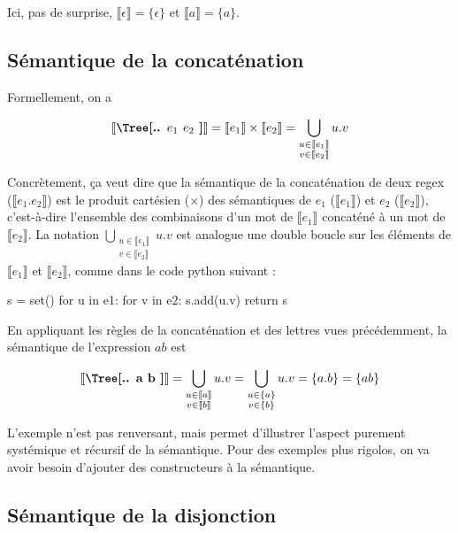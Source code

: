 Ici, pas de surprise, $\llbracket \epsilon \rrbracket = \{\epsilon\}$ et $\llbracket a \rrbracket = \{a\}$. 

\subsection{Sémantique de la concaténation}

Formellement, on a 

\[\mt{\Tree[.{.} $e_1$ $e_2$ ]} = \llbracket e_1 \rrbracket \times \llbracket e_2 \rrbracket = \bigcup_{\substack{u \in \llbracket e_1 \rrbracket \\ v \in \llbracket e_2 \rrbracket}} u.v \]

Concrètement, ça veut dire que la sémantique de la concaténation de deux regex ($\llbracket e_1.e_2 \rrbracket$) est le produit cartésien ($\times$) des sémantiques de $e_1$ ($\llbracket e_1 \rrbracket$) et $e_2$ ($\llbracket e_2 \rrbracket$), c'est-à-dire l'ensemble des combinaisons d'un mot de $\llbracket e_1 \rrbracket$ concaténé à un mot de $\llbracket e_2 \rrbracket$. La notation $\bigcup_{\substack{u \in \llbracket e_1 \rrbracket \\ v \in \llbracket e_2 \rrbracket}} u.v$ est analogue une double boucle sur les éléments de $\llbracket e_1 \rrbracket$ et $\llbracket e_2 \rrbracket$, comme dans le code python suivant :

\begin{python}
s = set()
for u in e1:
    for v in e2:
        s.add(u.v)
return s
\end{python}


\begin{example}
En appliquant les règles de la concaténation et des lettres vues précédemment, la sémantique de l'expression $ab$ est 

\[\mt{\Tree[.{.} a b ]} = \bigcup_{\substack{u \in \llbracket a \rrbracket \\ v \in \llbracket b \rrbracket}} u.v = \bigcup_{\substack{u \in \{a\} \\ v \in \{b\}}} u.v = \{a.b\} = \{ab\}\]
\end{example}

L'exemple n'est pas renversant, mais permet d'illustrer l'aspect purement systémique et récursif de la sémantique. Pour des exemples plus rigolos, on va avoir besoin d'ajouter des constructeurs à la sémantique.

\subsection{Sémantique de la disjonction}

